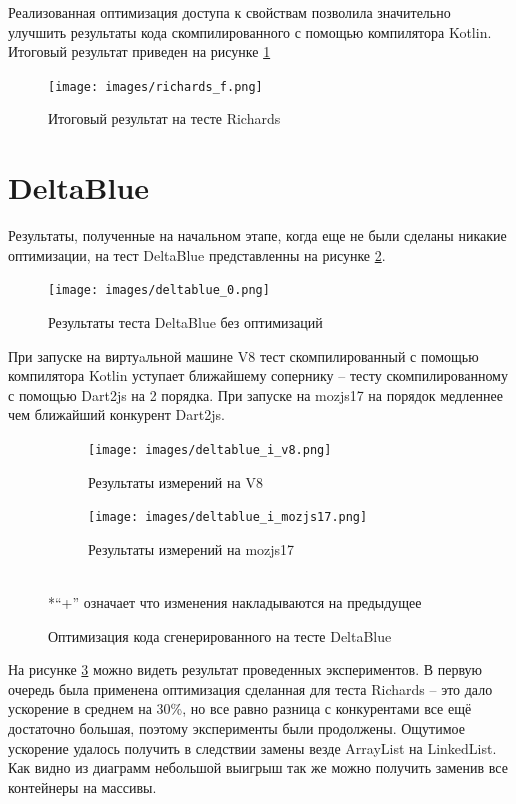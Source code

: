 Реализованная оптимизация доступа к свойствам позволила значительно улучшить результаты кода скомпилированного с помощью компилятора Kotlin. Итоговый результат приведен на рисунке \ref{richards_f}

\begin{figure}[ht!]
\centering
\texttt{[image: images/richards\_f.png]}
\caption{Итоговый результат на тесте Richards}
\label{richards_f}
\end{figure}

\section{DeltaBlue}

Результаты, полученные на начальном этапе, когда еще не были сделаны никакие оптимизации, на тест DeltaBlue представленны на рисунке \ref{deltablue_0}.

\begin{figure}[ht!]
\centering
\texttt{[image: images/deltablue\_0.png]}
\caption{Результаты теста DeltaBlue без оптимизаций}
\label{deltablue_0}
\end{figure}

При запуске на виртуaльной машине V8 тест скомпилированный с помощью компилятора Kotlin уступает ближайшему сопернику -- тесту скомпилированному с помощью Dart2js на 2 порядка. При запуске на mozjs17 на порядок медленнее чем ближайший конкурент Dart2js.

\begin{figure}[ht!]
\centering
	\begin{subfigure}[b]{0.63\textwidth}
	\centering
	\texttt{[image: images/deltablue\_i\_v8.png]}
	\caption{Результаты измерений на V8}
    \end{subfigure}

  	\begin{subfigure}[b]{0.63\textwidth}
	\centering
	\texttt{[image: images/deltablue\_i\_mozjs17.png]}
	\caption{Результаты измерений на mozjs17}
    \end{subfigure}
\\*``+'' означает что изменения накладываются на предыдущее
\caption{Оптимизация кода сгенерированного на тесте DeltaBlue}
\label{deltablue_i}
\end{figure}

На рисунке \ref{deltablue_i} можно видеть результат проведенных экспериментов. В первую очередь была применена оптимизация сделанная для теста Richards -- это дало ускорение в среднем на 30\%, но все равно разница с конкурентами все ещё достаточно большая, поэтому эксперименты были продолжены. Ощутимое ускорение удалось получить в следствии замены везде ArrayList на LinkedList.
Как видно из диаграмм небольшой выигрыш так же можно получить заменив все контейнеры на массивы. 

